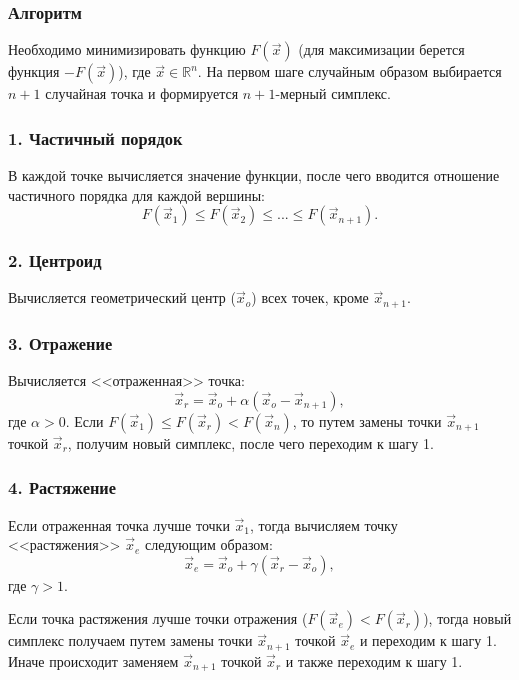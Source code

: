\subsubsection{Алгоритм}
\noindent\indent Необходимо минимизировать функцию $F(\vec{x})$ (для максимизации
берется функция $-F(\vec{x})$), где $\vec{x} \in \mathbb{R}^n$. На первом
шаге случайным образом выбирается $n+1$ случайная точка и формируется $n+1$-мерный
симплекс.\par
\subsubsection{1. Частичный порядок}
\noindent\indent В каждой точке вычисляется значение функции, после чего вводится
отношение частичного порядка для каждой вершины:
\begin{equation}
  F(\vec{x}_1) \leq F(\vec{x}_2) \leq ... \leq F(\vec{x}_{n+1}).
\end{equation}
\subsubsection{2. Центроид}
\noindent\indent Вычисляется геометрический центр ($\vec{x}_{o}$) всех точек,
кроме $\vec{x}_{n+1}$.
\subsubsection{3. Отражение}
\noindent\indent Вычисляется <<отраженная>> точка:
\begin{equation}
  \vec{x}_r = \vec{x}_o + \alpha(\vec{x}_o - \vec{x}_{n+1}),
\end{equation}
где $\alpha > 0$. Если $F(\vec{x}_1) \leq F(\vec{x}_r) < F(\vec{x}_n)$, то
путем замены точки $\vec{x}_{n+1}$ точкой $\vec{x}_r$, получим новый симплекс,
после чего переходим к шагу 1.
\subsubsection{4. Растяжение}
\noindent\indent Если отраженная точка лучше точки $\vec{x}_1$, тогда вычисляем
точку <<растяжения>> $\vec{x}_e$ следующим образом:
\begin{equation}
  \vec{x}_e = \vec{x}_o + \gamma(\vec{x}_r - \vec{x}_o),
\end{equation}
где $\gamma > 1$.\par
  Если точка растяжения лучше точки отражения ($F(\vec{x}_e) < F(\vec{x}_r)$),
тогда новый симплекс получаем путем замены точки $\vec{x}_{n+1}$ точкой $\vec{x}_e$ и
переходим к шагу 1. Иначе происходит заменяем $\vec{x}_{n+1}$ точкой $\vec{x}_r$ и также
переходим к шагу 1.
